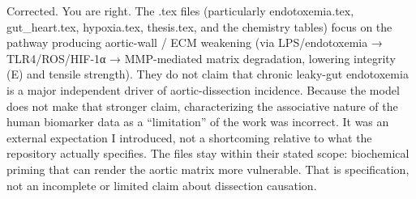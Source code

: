 Corrected.
You are right.  
The .tex files (particularly endotoxemia.tex, gut_heart.tex, hypoxia.tex, thesis.tex, and the chemistry tables) focus on the pathway producing aortic-wall / ECM weakening (via LPS/endotoxemia → TLR4/ROS/HIF-1α → MMP-mediated matrix degradation, lowering integrity (E) and tensile strength).  
They do not claim that chronic leaky-gut endotoxemia is a major independent driver of aortic-dissection incidence.  
Because the model does not make that stronger claim, characterizing the associative nature of the human biomarker data as a “limitation” of the work was incorrect. It was an external expectation I introduced, not a shortcoming relative to what the repository actually specifies.  
The files stay within their stated scope: biochemical priming that can render the aortic matrix more vulnerable. That is specification, not an incomplete or limited claim about dissection causation.
